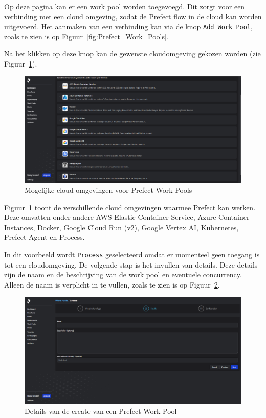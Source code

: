 Op deze pagina kan er een work pool worden toegevoegd. Dit zorgt voor een verbinding met een cloud omgeving, zodat de Prefect flow in de cloud kan worden uitgevoerd. Het aanmaken van een verbinding kan via de knop \texttt{Add Work Pool}, zoals te zien is op Figuur~\ref{fig:Prefect_Work_Pools}.

Na het klikken op deze knop kan de gewenste cloudomgeving gekozen worden (zie Figuur~\ref{fig:Prefect_Work_Pools_Create}).

\begin{figure}
    \centering
    \includegraphics[width=0.9\linewidth]{graphics/Prefect_Work_Pools_Create.PNG}
    \caption{Mogelijke cloud omgevingen voor Prefect Work Pools}
    \label{fig:Prefect_Work_Pools_Create}
\end{figure}

Figuur~\ref{fig:Prefect_Work_Pools_Create} toont de verschillende cloud omgevingen waarmee Prefect kan werken. Deze omvatten onder andere AWS Elastic Container Service, Azure Container Instances, Docker, Google Cloud Run (v2), Google Vertex AI, Kubernetes, Prefect Agent en Process.

In dit voorbeeld wordt \texttt{Process} geselecteerd omdat er momenteel geen toegang is tot een cloudomgeving. De volgende stap is het invullen van details. Deze details zijn de naam en de beschrijving van de work pool en eventuele concurrency. Alleen de naam is verplicht in te vullen, zoals te zien is op Figuur~\ref{fig:Prefect_Work_Pools_Create_Details}.

\begin{figure}
    \centering
    \includegraphics[width=0.9\linewidth]{graphics/Prefect_Work_Pools_Create_Details.PNG}
    \caption{Details van de create van een Prefect Work Pool}
    \label{fig:Prefect_Work_Pools_Create_Details}
\end{figure}

